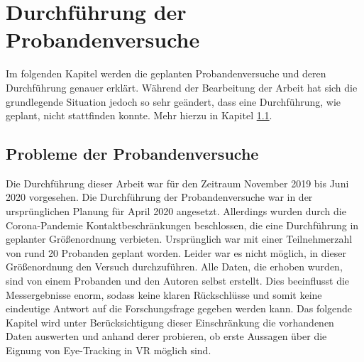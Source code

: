 
\chapter{Durchführung  der Probandenversuche} 

Im folgenden Kapitel werden die geplanten Probandenversuche und deren Durchführung genauer erklärt. Während der Bearbeitung der Arbeit hat sich die grundlegende Situation jedoch so sehr geändert, dass eine Durchführung, wie geplant, nicht stattfinden konnte. Mehr hierzu in Kapitel \ref{section:corona}.
\section{Probleme der Probandenversuche}
\label{section:corona}
Die Durchführung dieser Arbeit war für den Zeitraum November 2019 bis Juni 2020 vorgesehen. Die Durchführung der Probandenversuche war in der ursprünglichen Planung für April 2020 angesetzt. Allerdings wurden durch die Corona-Pandemie  Kontaktbeschränkungen beschlossen, die eine Durchführung in geplanter Größenordnung verbieten. Ursprünglich war mit einer Teilnehmerzahl von rund 20 Probanden geplant worden. Leider war es nicht möglich, in dieser Größenordnung den Versuch durchzuführen. Alle Daten, die erhoben wurden, sind von einem Probanden und den Autoren selbst erstellt. Dies beeinflusst die Messergebnisse enorm, sodass keine klaren Rückschlüsse und somit keine eindeutige Antwort auf die Forschungsfrage gegeben werden kann. Das folgende Kapitel wird unter Berücksichtigung dieser Einschränkung die vorhandenen Daten auswerten und anhand derer probieren, ob erste Aussagen über die Eignung von Eye-Tracking in VR möglich sind.
